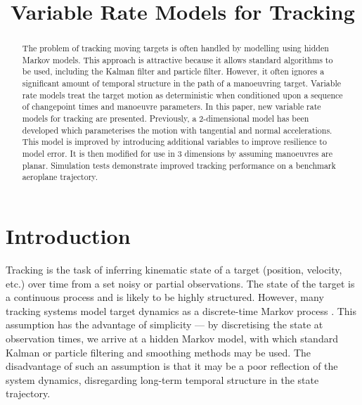 \documentclass[conference]{IEEEtran}
\begin{document}
\title{Variable Rate Models for Tracking}

\author{
}

\maketitle



\begin{abstract}

The problem of tracking moving targets is often handled by modelling using hidden Markov models. This approach is attractive because it allows standard algorithms to be used, including the Kalman filter and particle filter. However, it often ignores a significant amount of temporal structure in the path of a manoeuvring target. Variable rate models treat the target motion as deterministic when conditioned upon a sequence of changepoint times and manoeuvre parameters. In this paper, new variable rate models for tracking are presented. Previously, a 2-dimensional model has been developed which parameterises the motion with tangential and normal accelerations. This model is improved by introducing additional variables to improve resilience to model error. It is then modified for use in 3 dimensions by assuming manoeuvres are planar. Simulation tests demonstrate improved tracking performance on a benchmark aeroplane trajectory.

\end{abstract}



\section{Introduction}

Tracking is the task of inferring kinematic state of a target (position, velocity, etc.) over time from a set noisy or partial observations. The state of the target is a continuous process and is likely to be highly structured. However, many tracking systems model target dynamics as a discrete-time Markov process \cite{Li2003}. This assumption has the advantage of simplicity --- by discretising the state at observation times, we arrive at a hidden Markov model, with which standard Kalman \cite{Anderson1979} or particle \cite{Cappe2007,Doucet2009} filtering and smoothing methods may be used. The disadvantage of such an assumption is that it may be a poor reflection of the system dynamics, disregarding long-term temporal structure in the state trajectory.
\end{document}
